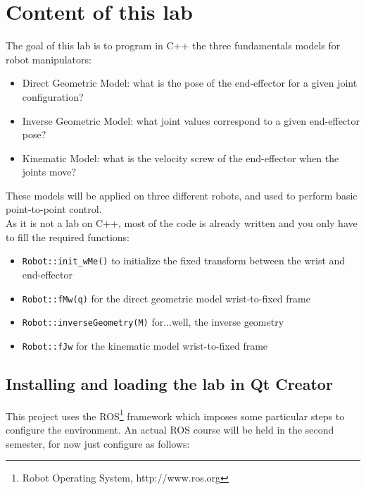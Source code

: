 \documentclass{ecnreport}
\begin{document}
  
  
  \section{Content of this lab}
  
  The goal of this lab is to program in C++ the three fundamentals models for robot manipulators:
  \begin{itemize}
    \item Direct Geometric Model: what is the pose of the end-effector for a given joint configuration?
    \item Inverse Geometric Model: what joint values correspond to a given end-effector pose?
    \item Kinematic Model: what is the velocity screw of the end-effector when the joints move?
  \end{itemize}
  These models will be applied on three different robots, and used to perform basic point-to-point control.\\
  
  As it is not a lab on C++, most of the code is already written and you only have to fill the required functions:
  \begin{itemize}
    \item \texttt{Robot::init\_wMe()} to initialize the fixed transform between the wrist and end-effector
    \item \texttt{Robot::fMw(q)} for the direct geometric model wrist-to-fixed frame
    \item \texttt{Robot::inverseGeometry(M)} for...well, the inverse geometry
    \item \texttt{Robot::fJw} for the kinematic model wrist-to-fixed frame
  \end{itemize}
  
  \subsection{Installing and loading the lab in Qt Creator}
  
  This project uses the ROS\footnote{Robot Operating System, http://www.ros.org} framework which imposes some particular steps to configure the environment. An actual ROS course will be held in the second semester, for now just configure as follows:
  
\end{document}

